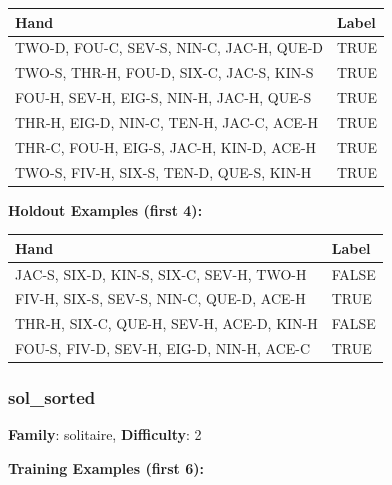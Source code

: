 \documentclass[10pt,a4paper]{article}
\begin{document}
\begin{small}
\begin{tabular}{p{8cm}l}
\toprule
Hand & Label \\
\midrule
TWO-D, FOU-C, SEV-S, NIN-C, JAC-H, QUE-D & \textcolor{positive}{TRUE} \\
TWO-S, THR-H, FOU-D, SIX-C, JAC-S, KIN-S & \textcolor{positive}{TRUE} \\
FOU-H, SEV-H, EIG-S, NIN-H, JAC-H, QUE-S & \textcolor{positive}{TRUE} \\
THR-H, EIG-D, NIN-C, TEN-H, JAC-C, ACE-H & \textcolor{positive}{TRUE} \\
THR-C, FOU-H, EIG-S, JAC-H, KIN-D, ACE-H & \textcolor{positive}{TRUE} \\
TWO-S, FIV-H, SIX-S, TEN-D, QUE-S, KIN-H & \textcolor{positive}{TRUE} \\
\bottomrule
\end{tabular}
\end{small}

\textbf{Holdout Examples (first 4):}

\begin{small}
\begin{tabular}{p{8cm}l}
\toprule
Hand & Label \\
\midrule
JAC-S, SIX-D, KIN-S, SIX-C, SEV-H, TWO-H & \textcolor{negative}{FALSE} \\
FIV-H, SIX-S, SEV-S, NIN-C, QUE-D, ACE-H & \textcolor{positive}{TRUE} \\
THR-H, SIX-C, QUE-H, SEV-H, ACE-D, KIN-H & \textcolor{negative}{FALSE} \\
FOU-S, FIV-D, SEV-H, EIG-D, NIN-H, ACE-C & \textcolor{positive}{TRUE} \\
\bottomrule
\end{tabular}
\end{small}

\vspace{0.5cm}

\subsubsection{sol\_sorted}

\textbf{Family}: solitaire, \textbf{Difficulty}: 2

\textbf{Training Examples (first 6):}
\end{document}
